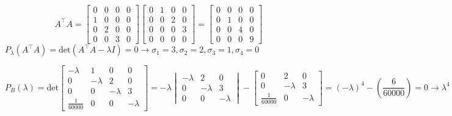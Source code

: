 \begin{enumerate}[label=\color{red}\textbf{\arabic*)}]
\[
A^\intercal A=\begin{bmatrix} 
    0 & 0 & 0 & 0\\
    1 & 0 & 0 & 0\\
    0 & 2 & 0 & 0\\
    0 & 0 & 3 & 0
\end{bmatrix} \begin{bmatrix} 
    0 & 1 & 0 & 0\\
    0 & 0 & 2 & 0\\
    0 & 0 & 0 & 3\\
    0 & 0 & 0 & 0
\end{bmatrix} =\begin{bmatrix} 
    0 & 0 & 0 & 0\\
    0 & 1 & 0 & 0\\
    0 & 0 & 4 & 0\\
    0 & 0 & 0 & 9
\end{bmatrix} 
\] 
$P_\lambda(A^\intercal A)=\mathrm{det}(A^\intercal A-\lambda I)=0\longrightarrow \sigma_1=3,\sigma_2=2,\sigma_3=1,\sigma_4=0$ 

$P_B(\lambda)=\mathrm{det}\begin{bmatrix} 
    -\lambda & 1 & 0 & 0\\
    0 & -\lambda & 2 & 0\\
    0 & 0 & -\lambda & 3\\
    \frac{1}{60000} & 0 & 0 & -\lambda 
\end{bmatrix}=-\lambda\begin{vmatrix} 
    -\lambda & 2 & 0\\
    0 & -\lambda & 3\\
    0 & 0 & -\lambda
\end{vmatrix}-\begin{bmatrix} 
    0 & 2 & 0\\
    0 & -\lambda & 3\\
    \frac{1}{60000} & 0 & -\lambda 
\end{bmatrix} =(-\lambda)^4-\left( \dfrac{6}{60000} \right)=0\longrightarrow \lambda^4=10^{-4}\begin{cases}
    \lambda_1=0.1\text{ multiplicidad 2 }\\
    \lambda_2=0.1j\text{ multiplicidad 2 }\\
\end{cases}  $ 


\end{enumerate}
